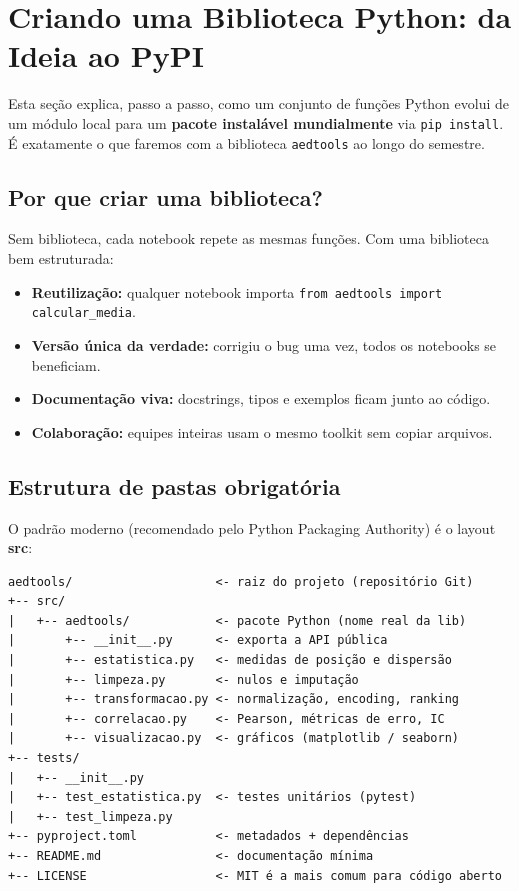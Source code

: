 \section{Criando uma Biblioteca Python: da Ideia ao PyPI}

Esta seção explica, passo a passo, como um conjunto de funções Python
evolui de um módulo local para um \textbf{pacote instalável mundialmente}
via \texttt{pip install}. É exatamente o que faremos com a biblioteca
\texttt{aedtools} ao longo do semestre.

\subsection*{Por que criar uma biblioteca?}

Sem biblioteca, cada notebook repete as mesmas funções. Com uma
biblioteca bem estruturada:
\begin{itemize}[leftmargin=*]
  \item \textbf{Reutilização:} qualquer notebook importa \texttt{from aedtools import calcular\_media}.
  \item \textbf{Versão única da verdade:} corrigiu o bug uma vez, todos os notebooks se beneficiam.
  \item \textbf{Documentação viva:} docstrings, tipos e exemplos ficam junto ao código.
  \item \textbf{Colaboração:} equipes inteiras usam o mesmo toolkit sem copiar arquivos.
\end{itemize}

\subsection*{Estrutura de pastas obrigatória}

O padrão moderno (recomendado pelo Python Packaging Authority) é o layout
\textbf{src}:

\begin{lstlisting}[language={}]
aedtools/                    <- raiz do projeto (repositório Git)
+-- src/
|   +-- aedtools/            <- pacote Python (nome real da lib)
|       +-- __init__.py      <- exporta a API pública
|       +-- estatistica.py   <- medidas de posição e dispersão
|       +-- limpeza.py       <- nulos e imputação
|       +-- transformacao.py <- normalização, encoding, ranking
|       +-- correlacao.py    <- Pearson, métricas de erro, IC
|       +-- visualizacao.py  <- gráficos (matplotlib / seaborn)
+-- tests/
|   +-- __init__.py
|   +-- test_estatistica.py  <- testes unitários (pytest)
|   +-- test_limpeza.py
+-- pyproject.toml           <- metadados + dependências
+-- README.md                <- documentação mínima
+-- LICENSE                  <- MIT é a mais comum para código aberto
\end{lstlisting}

